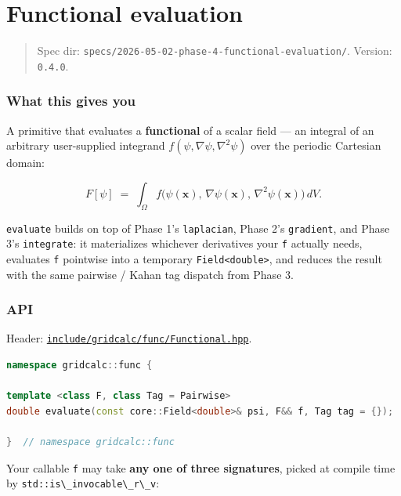 \chapter{Functional evaluation}
\label{chap:functional-evaluation}

\begin{quote}
Spec dir:
\passthrough{\lstinline!specs/2026-05-02-phase-4-functional-evaluation/!}.
Version: \passthrough{\lstinline!0.4.0!}.
\end{quote}

\subsection{What this gives you}\label{what-this-gives-you}

A primitive that evaluates a \textbf{functional} of a scalar field ---
an integral of an arbitrary user-supplied integrand
\(f(\psi, \nabla\psi, \nabla^2\psi)\) over the periodic Cartesian
domain:

\[
F[\psi] \;=\; \int_{\Omega} f\bigl(\psi(\mathbf{x}),\, \nabla\psi(\mathbf{x}),\, \nabla^2\psi(\mathbf{x})\bigr)\, dV.
\]

\passthrough{\lstinline!evaluate!} builds on top of Phase 1's
\passthrough{\lstinline!laplacian!}, Phase 2's
\passthrough{\lstinline!gradient!}, and Phase 3's
\passthrough{\lstinline!integrate!}: it materializes whichever
derivatives your \passthrough{\lstinline!f!} actually needs, evaluates
\passthrough{\lstinline!f!} pointwise into a temporary
\passthrough{\lstinline!Field<double>!}, and reduces the result with the
same pairwise / Kahan tag dispatch from Phase 3.

\subsection{API}\label{api}

Header:
\href{../../../include/gridcalc/func/Functional.hpp}{\passthrough{\lstinline!include/gridcalc/func/Functional.hpp!}}.

\begin{lstlisting}[language={C++}]
namespace gridcalc::func {

template <class F, class Tag = Pairwise>
double evaluate(const core::Field<double>& psi, F&& f, Tag tag = {});

}  // namespace gridcalc::func
\end{lstlisting}

Your callable \passthrough{\lstinline!f!} may take \textbf{any one of
three signatures}, picked at compile time by
\passthrough{\lstinline!std::is\_invocable\_r\_v!}:

